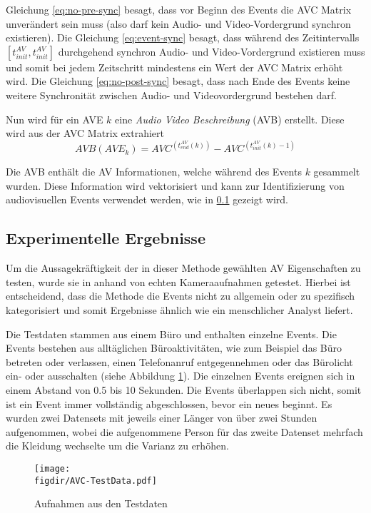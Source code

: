 Gleichung \ref{eq:no-pre-sync} besagt, dass vor Beginn des Events die AVC Matrix unverändert sein muss (also darf kein Audio- und Video-Vordergrund synchron existieren). Die Gleichung \ref{eq:event-sync} besagt, dass während des Zeitintervalls $[t_{init}^{AV}, t_{init}^{AV}]$ durchgehend synchron Audio- und Video-Vordergrund existieren muss und somit bei jedem Zeitschritt mindestens ein Wert der AVC Matrix erhöht wird. Die Gleichung \ref{eq:no-post-sync} besagt, dass nach Ende des Events keine weitere Synchronität zwischen Audio- und Videovordergrund bestehen darf. 

Nun wird für ein AVE $k$ eine \textit{Audio Video Beschreibung} (AVB) erstellt. Diese wird aus der AVC Matrix extrahiert
\begin{equation}
AVB(AVE_k) = AVC^{(t_{end}^{AV}(k))} - AVC^{(t_{init}^{AV}(k)-1)}
\end{equation}

Die AVB enthält die AV Informationen, welche während des Events $k$ gesammelt wurden. Diese Information wird vektorisiert und kann zur Identifizierung von audiovisuellen Events verwendet werden, wie in \ref{ss:experiment} gezeigt wird.

\subsection{Experimentelle Ergebnisse} \label{ss:experiment}

Um die Aussagekräftigkeit der in dieser Methode gewählten AV Eigenschaften zu testen, wurde sie in \cite{CBM07:Experiment} anhand von echten Kameraaufnahmen getestet. Hierbei ist entscheidend, dass die Methode die Events nicht zu allgemein oder zu spezifisch kategorisiert und somit Ergebnisse ähnlich wie ein menschlicher Analyst liefert.

Die Testdaten stammen aus einem Büro und enthalten einzelne Events. Die Events bestehen aus alltäglichen Büroaktivitäten, wie zum Beispiel das Büro betreten oder verlassen, einen Telefonanruf entgegennehmen oder das Bürolicht ein- oder ausschalten (siehe Abbildung \ref{FIG:AVC:TestData}). Die einzelnen Events ereignen sich in einem Abstand von 0.5 bis 10 Sekunden. Die Events überlappen sich nicht, somit ist ein Event immer vollständig abgeschlossen, bevor ein neues beginnt. Es wurden zwei Datensets mit jeweils einer Länger von über zwei Stunden aufgenommen, wobei die aufgenommene Person für das zweite Datenset mehrfach die Kleidung wechselte um die Varianz zu erhöhen.

\begin{figure}
\centering
\texttt{[image: \\figdir/AVC-TestData.pdf]}
\caption{Aufnahmen aus den Testdaten}
\label{FIG:AVC:TestData}
\end{figure}

